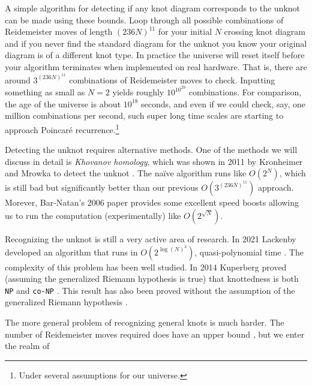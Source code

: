     A simple algorithm for detecting if any knot diagram corresponds to the
    unknot can be made using these bounds. Loop through all possible
    combinations of Reidemeister moves of length $(236N)^{11}$ for your
    initial $N$ crossing knot diagram and if you never
    find the standard diagram for the unknot you know your original diagram
    is of a different knot type. In practice the universe will reset itself
    before your algorithm terminates when implemented on real hardware. That is,
    there are around $3^{(236N)^{11}}$ combinations of Reidemeister moves to
    check. Inputting something as small as $N=2$ yields roughly
    $10^{10^{29}}$ combinations. For comparison, the age of the universe is
    about $10^{18}$ seconds, and even if we could check, say, one million
    combinations per second, such super long time scales are starting to
    approach Poincar\'{e} recurrence.\footnote{%
        Under several assumptions for our universe.
    }
    \par\hfill\par
    Detecting the unknot requires alternative methods. One of the methods we
    will discuss in detail is \textit{Khovanov homology}, which was shown in
    2011 by Kronheimer and Mrowka to detect the unknot
    \cite{KronheimerMrowka2011KhovanovUnknot}. The na\"{i}ve algorithm runs
    like $O(2^{N})$, which is still bad but significantly better than our
    previous $O(3^{(236N)^{11}})$ approach. Morever,
    Bar-Natan's 2006 paper provides some excellent speed boosts
    \cite{BarNatan2006FASTKH} allowing us to run the computation
    (experimentally) like $O(2^{\sqrt{N}})$.
    \par\hfill\par
    Recognizing the unknot is still a very active area of research. In 2021
    Lackenby developed an algorithm that runs in
    $O(2^{\log(N)^{3}})$, quasi-polynomial time
    \cite{LackenBy2021QuasiPolyUnknotting}. The complexity of this problem
    has been well studied. In 2014 Kuperberg proved (assuming the generalized
    Riemann hypothesis is true) that knottedness is both \texttt{NP} and
    \texttt{co-NP} \cite{Kuperberg2014KnottednessNP}. This result has also been
    proved without the assumption of the generalized Riemann hypothesis
    \cite{Lackenby2021UnknotNP}.
    \par\hfill\par
    The more general problem of recognizing general knots is much harder.
    The number of Reidemeister moves required does have an upper bound
    \cite{CowardLackenbyReidemeisterUpperBound}, but we enter the realm of
